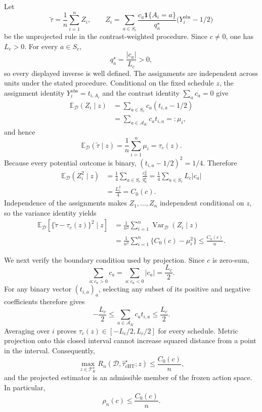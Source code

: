 Let
\[
 \widetilde\tau=\frac1n\sum_{i=1}^n Z_i,
 \qquad
 Z_i=\sum_{a\in S_c}\frac{c_a\mathbf 1\{A_i=a\}}{q_a^\star}
 \bigl(Y_i^{\mathrm{obs}}-1/2\bigr)
\]
be the unprojected rule in the contrast-weighted procedure.  Since \(c\ne0\), one has \(L_c>0\).  For every \(a\in S_c\),
\[
 q_a^\star=\frac{|c_a|}{L_c}>0,
\]
so every displayed inverse is well defined.  The assignments are independent across units under the stated procedure.  Conditional on the fixed schedule \(z\), the assignment identity \(Y_i^{\mathrm{obs}}=t_{i,A_i}\) and the contrast identity \(\sum_a c_a=0\) give
\[
 \begin{aligned}
 \mathbb E_{\mathcal D}(Z_i\mid z)
 &=\sum_{a\in S_c}c_a(t_{i,a}-1/2)\\
 &=\sum_{a\in\mathcal A_K}c_at_{i,a}
 =:\mu_i,
 \end{aligned}
\]
and hence
\[
 \mathbb E_{\mathcal D}(\widetilde\tau\mid z)
 =\frac1n\sum_{i=1}^n\mu_i=\tau_c(z).
\]
Because every potential outcome is binary, \((t_{i,a}-1/2)^2=1/4\).  Therefore
\[
 \begin{aligned}
 \mathbb E_{\mathcal D}(Z_i^2\mid z)
 &=\frac14\sum_{a\in S_c}\frac{c_a^2}{q_a^\star}
 =\frac14\sum_{a\in S_c}L_c|c_a|\\
 &=\frac{L_c^2}{4}=C_0(c).
 \end{aligned}
\]
Independence of the assignments makes \(Z_1,\ldots,Z_n\) independent conditional on \(z\), so the variance identity yields
\[
 \begin{aligned}
 \mathbb E_{\mathcal D}\!\left[\{\widetilde\tau-\tau_c(z)\}^2\mid z\right]
 &=\frac1{n^2}\sum_{i=1}^n\operatorname{Var}_{\mathcal D}(Z_i\mid z)\\
 &=\frac1{n^2}\sum_{i=1}^n\{C_0(c)-\mu_i^2\}
 \leq\frac{C_0(c)}n.
 \end{aligned}
\]

We next verify the boundary condition used by projection.  Since \(c\) is zero-sum,
\[
 \sum_{a:c_a>0}c_a=\sum_{a:c_a<0}|c_a|=\frac{L_c}{2}.
\]
For any binary vector \((t_{i,a})_a\), selecting any subset of its positive and negative coefficients therefore gives
\[
 -\frac{L_c}{2}\leq\sum_{a\in\mathcal A_K}c_at_{i,a}\leq\frac{L_c}{2}.
\]
Averaging over \(i\) proves \(\tau_c(z)\in[-L_c/2,L_c/2]\) for every schedule.  Metric projection onto this closed interval cannot increase squared distance from a point in the interval.  Consequently,
\[
 \max_{z\in\mathcal T_K^n}
 R_n(\mathcal D,\widehat\tau_{\mathrm{cHT}}^\star;z)
 \leq\frac{C_0(c)}n,
\]
and the projected estimator is an admissible member of the frozen action space.  In particular,
\[
 \rho_n(c)\leq\frac{C_0(c)}n.
\]

